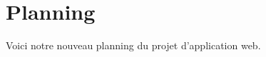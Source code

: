 \chapter{Planning}
Voici notre nouveau planning du projet d'application web.
\begin{flushleft}
\\
\end{flushleft}